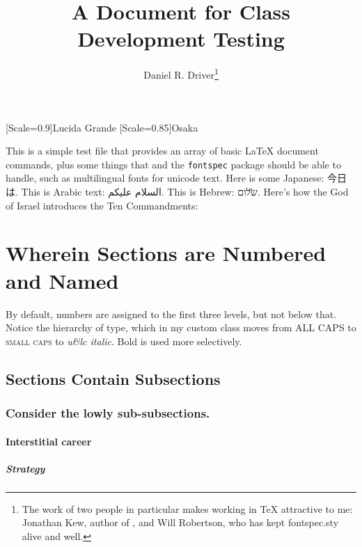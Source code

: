 \documentclass[11pt]{drd-article}
\title{A Document for Class Development Testing}
\author{Daniel R. Driver\thanks{The work of two people in particular makes working in 
\TeX{}  attractive to me: Jonathan Kew, author of \XeTeX, and Will Robertson, who has 
kept fontspec.sty alive and well.}}
\begin{document}
\maketitle

\newfontfamily{\H}[Scale=0.9]{Lucida Grande}
\newfontfamily{\J}[Scale=0.85]{Osaka}

This is a simple test file that provides an array of basic \LaTeX{} document commands,
plus some things that \XeTeX and the \verb=fontspec= package should be able to handle,
such as multilingual fonts for unicode text. Here is some Japanese: {\J 今日は}. This 
is Arabic text: {\A السلام عليكم}. This is Hebrew: {\H שלום}. Here's how the God of Israel
introduces the Ten Commandments:

\setLR

\section{Wherein Sections are Numbered and Named}
By default, numbers are assigned to the first three levels, but not below that. Notice the 
hierarchy of type, which in my custom class moves from ALL CAPS to \textsc{small caps} to 
\emph{u\&lc italic}. Bold is used more selectively.

\lipsum[1]

\subsection{Sections Contain Subsections}

\lipsum[2]

\subsubsection{Consider the lowly sub-subsections.}
\lipsum[3]

\begin{quotation}
\lipsum[4-5]
\end{quotation}

\lipsum[6]

\paragraph{Interstitial career}
\lipsum[7]

\subparagraph{Strategy}

\lipsum[8]
\end{document}
